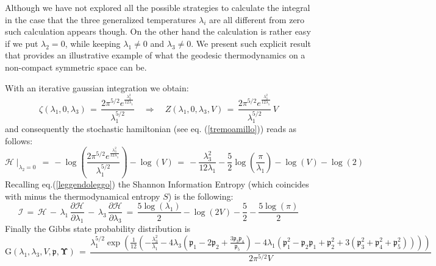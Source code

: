 \documentclass[10pt,a4paper]{article}
\begin{document}
 Although we have not explored all the possible strategies to calculate the integral in the case that the three generalized temperatures
 $\lambda_i$ are all different from zero such calculation appears though. On the other hand the calculation is rather easy if we put
 $\lambda_2=0$, while keeping $\lambda_1\neq 0$ and $\lambda_3 \neq 0$. We present such explicit result that provides an illustrative example of what the geodesic thermodynamics on a non-compact symmetric space can be.
 \par
 With an iterative gaussian integration we obtain:
 \begin{equation}\label{zerlina2zero}
   \zeta(\lambda_1,0,\lambda_3) \, = \, \frac{2 \pi ^{5/2} e^{\frac{\lambda _3^2}{12 \lambda _1}}}{\lambda _1^{5/2}} \quad \Rightarrow \quad Z(\lambda_1,0,\lambda_3,V) \, = \, \frac{2 \pi ^{5/2} e^{\frac{\lambda _3^2}{12 \lambda _1}}}{\lambda _1^{5/2}} \, V
 \end{equation}
 and consequently the stochastic hamiltonian (see eq. (\ref{tremoamillo})) reads as follows:
 \begin{equation}\label{maialotto}
   \mathcal{H}\mid_{\lambda_2=0} \, = \, -\log \left(\frac{2 \pi ^{5/2} e^{\frac{\lambda _3^2}{12 \lambda _1}}}{\lambda
   _1^{5/2}}\right)-\log (V) \, = \, -\frac{\lambda _3^2}{12 \lambda _1}-\frac{5}{2} \log \left(\frac{\pi }{\lambda
   _1}\right)-\log (V)-\log (2)
 \end{equation}
 Recalling eq.(\ref{leggendoleggo}) the Shannon Information Entropy (which coincides with minus the thermodynamical entropy $S$) is the following:
 \begin{equation}\label{lucidapavimenti}
   \mathcal{I} \, = \,  \mathcal{H} \, - \, \lambda_1 \, \frac{\partial \mathcal{H}}{\partial\lambda_1} \, - \,
   \lambda_3 \, \frac{\partial \mathcal{H}}{\partial\lambda_3} \, = \, \frac{5 \log \left(\lambda _1\right)}{2}-\log (2 V)-\frac{5}{2}-\frac{5 \log (\pi )}{2}
 \end{equation}
 Finally the Gibbs state probability distribution is
\begin{equation}\label{cartilagine}
   \mathrm{G}\left(\lambda_1,\lambda_3, V,\boldsymbol{\mathfrak{p}},\boldsymbol{\Upsilon}\right) \, = \,
   \frac{\lambda _1^{5/2} \exp \left(\frac{1}{12} \left(-\frac{\lambda _3^2}{\lambda _1}-4
   \lambda _3 \left(\mathfrak{p}_1-2 \mathfrak{p}_2+\frac{3 \mathfrak{p}_3
   \mathfrak{p}_4}{\mathfrak{p}_5}\right)-4 \lambda _1
   \left(\mathfrak{p}_1^2-\mathfrak{p}_2 \mathfrak{p}_1+\mathfrak{p}_2^2+3
   \left(\mathfrak{p}_3^2+\mathfrak{p}_4^2+\mathfrak{p}_5^2\right)\right)\right)\right)
   }{2 \pi ^{5/2} V}
 \end{equation}
\end{document}
